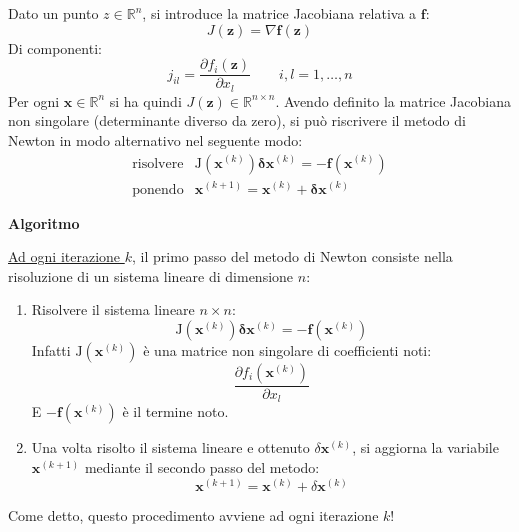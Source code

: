 \highspace
Dato un punto $z \in \mathbb{R}^{n}$, si introduce la matrice Jacobiana relativa a $\mathbf{f}$:
\begin{equation}
	J\left(\mathbf{z}\right) = \nabla \mathbf{f}\left(\mathbf{z}\right)
\end{equation}
Di componenti:
\begin{equation}
	j_{il} = \dfrac{\partial f_{i}\left(\mathbf{z}\right)}{\partial x_{l}} \hspace{2em} i,l = 1, \dots, n
\end{equation}
Per ogni $\mathbf{x} \in \mathbb{R}^{n}$ si ha quindi $J\left(\mathbf{z}\right) \in \mathbb{R}^{n \times n}$. Avendo definito la matrice Jacobiana non singolare (determinante diverso da zero), si può riscrivere il metodo di Newton in modo alternativo nel seguente modo:
\begin{equation}
	\begin{array}{ll}
		\text{risolvere} & \mathrm{J}\left(\mathbf{x}^{\left(k\right)}\right)\mathbf{\delta}\mathbf{x}^{\left(k\right)} = -\mathbf{f}\left(\mathbf{x}^{\left(k\right)}\right) \\ [1em]
		\text{ponendo} 	 & \mathbf{x}^{\left(k+1\right)} = \mathbf{x}^{\left(k\right)} + \mathbf{\delta}\mathbf{x}^{\left(k\right)}
	\end{array}
\end{equation}

\begin{flushleft}
	\textcolor{Green3}{ \textbf{Algoritmo}}
\end{flushleft}
\underline{Ad ogni iterazione $k$}, il primo passo del metodo di Newton consiste nella risoluzione di un sistema lineare di dimensione $n$:
\begin{enumerate}
	\item Risolvere il sistema lineare $n \times n$:
	\begin{equation*}
		\mathrm{J}\left(\mathbf{x}^{\left(k\right)}\right)\mathbf{\delta}\mathbf{x}^{\left(k\right)} = -\mathbf{f}\left(\mathbf{x}^{\left(k\right)}\right)
	\end{equation*}
	Infatti $\mathrm{J}\left(\mathbf{x}^{\left(k\right)}\right)$ è una matrice non singolare di coefficienti noti:
	\begin{equation*}
		\dfrac{\partial f_{i}\left(\mathbf{x}^{\left(k\right)}\right)}{\partial x_{l}}
	\end{equation*}
	E $-\mathbf{f}\left(\mathbf{x}^{\left(k\right)}\right)$ è il termine noto.
	
	\item Una volta risolto il sistema lineare e ottenuto $\delta\mathbf{x}^{\left(k\right)}$, si aggiorna la variabile $\mathbf{x}^{\left(k+1\right)}$ mediante il secondo passo del metodo:
	\begin{equation*}
		\mathbf{x}^{\left(k+1\right)} = \mathbf{x}^{\left(k\right)} + \delta\mathbf{x}^{\left(k\right)}
	\end{equation*}
\end{enumerate}
Come detto, questo procedimento avviene ad ogni iterazione $k$!

